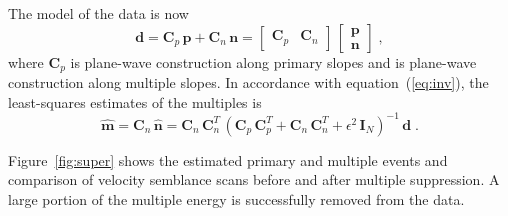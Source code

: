 

The model of the data is now \cite[]{GEO65-02-05740583,FBR20-03-01610167}
\begin{equation}
\label{eq:splusn}
  \mathbf{d} = \mathbf{C}_p\,\mathbf{p}+\mathbf{C}_n\,\mathbf{n} = 
  \left[\begin{array}{cc} \mathbf{C}_p & \mathbf{C}_n \end{array}\right]\,
  \left[\begin{array}{c} \mathbf{p} \\ \mathbf{n} \end{array}\right]\;,
\end{equation}
where $\mathbf{C}_p$ is plane-wave construction along primary slopes
and   is plane-wave
construction along multiple slopes. In accordance with
equation~(\ref{eq:inv}), the least-squares estimates of the multiples
is
\begin{equation}
\label{eq:mult}
  \widehat{\mathbf{m}} = \mathbf{C}_n\,\widehat{\mathbf{n}} =
  \mathbf{C}_n\,\mathbf{C}_n^T\,
  \left(\mathbf{C}_p\,\mathbf{C}_p^T + \mathbf{C}_n\,\mathbf{C}_n^T + \epsilon^2\,\mathbf{I}_N\right)^{-1}\,\mathbf{d}\;.
\end{equation}

Figure~\ref{fig:super} shows the estimated primary and multiple events
and comparison of velocity semblance scans before and after multiple
suppression. A large portion of the multiple energy is successfully
removed from the data.


